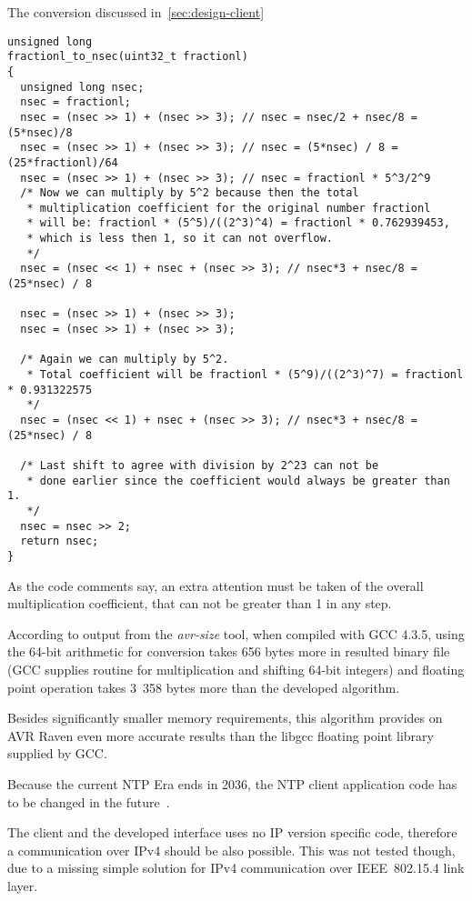 The conversion discussed in~\ref{sec:design-client}
\begin{lstlisting}[caption=Conversion from NTP fraction part to nanoseconds]
unsigned long
fractionl_to_nsec(uint32_t fractionl)
{
  unsigned long nsec;
  nsec = fractionl;
  nsec = (nsec >> 1) + (nsec >> 3); // nsec = nsec/2 + nsec/8 = (5*nsec)/8
  nsec = (nsec >> 1) + (nsec >> 3); // nsec = (5*nsec) / 8 = (25*fractionl)/64
  nsec = (nsec >> 1) + (nsec >> 3); // nsec = fractionl * 5^3/2^9
  /* Now we can multiply by 5^2 because then the total
   * multiplication coefficient for the original number fractionl
   * will be: fractionl * (5^5)/((2^3)^4) = fractionl * 0.762939453,
   * which is less then 1, so it can not overflow.
   */
  nsec = (nsec << 1) + nsec + (nsec >> 3); // nsec*3 + nsec/8 = (25*nsec) / 8

  nsec = (nsec >> 1) + (nsec >> 3);
  nsec = (nsec >> 1) + (nsec >> 3);

  /* Again we can multiply by 5^2.
   * Total coefficient will be fractionl * (5^9)/((2^3)^7) = fractionl * 0.931322575
   */
  nsec = (nsec << 1) + nsec + (nsec >> 3); // nsec*3 + nsec/8 = (25*nsec) / 8

  /* Last shift to agree with division by 2^23 can not be
   * done earlier since the coefficient would always be greater than 1.
   */
  nsec = nsec >> 2;
  return nsec;
}
\end{lstlisting}
As the code comments say, an extra attention must be taken of the overall
multiplication coefficient,
that can not be greater than 1 in any step.

According to output from the {\it{avr-size}} tool,
when compiled with GCC 4.3.5,
using the 64-bit arithmetic for conversion
takes 656 bytes more in %
resulted binary file (GCC supplies routine for multiplication and shifting 64-bit integers)
and floating point operation takes 3~358 bytes more
than the developed algorithm.


Besides significantly smaller memory requirements,
this algorithm provides on AVR Raven even more accurate results than the libgcc
floating point library supplied by GCC.


Because the current NTP Era ends in 2036,
the NTP client application code has to be changed in the future~\cite{ntp-y2k}.

The client and the developed interface uses no IP version specific code,
therefore a communication over IPv4 should be also possible.
This was not tested though, due to a missing simple solution for
IPv4 communication over IEEE~802.15.4 link layer.
